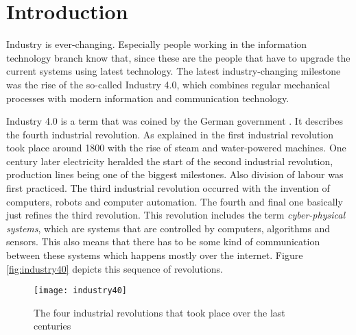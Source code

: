 \chapter{Introduction}
\label{ch:Introduction}




Industry is ever-changing. Especially people working in the information technology branch know that, since these are the people that have to upgrade the current systems using latest technology. The latest industry-changing milestone was the rise of the so-called Industry 4.0, which combines regular mechanical processes with modern information and communication technology.

Industry 4.0 is a term that was coined by the German government \autocite{Industrie4.0Paper}. It describes the fourth industrial revolution. As explained in  the first industrial revolution took place around 1800 with the rise of steam and water-powered machines. One century later electricity heralded the start of the second industrial revolution, production lines being one of the biggest milestones. Also division of labour was first practiced. The third industrial revolution occurred with the invention of computers, robots and computer automation. The fourth and final one basically just refines the third revolution. This revolution includes the term \textit{cyber-physical systems}, which are systems that are controlled by computers, algorithms and sensors. This also means that there has to be some kind of communication between these systems which happens mostly over the internet. Figure \vref{fig:industry40} depicts this sequence of revolutions.

\begin{figure}[H]
    \centering
    \texttt{[image: industry40]}
    \caption[The four industrial revolutions that took place over the last centuries]{The four industrial revolutions that took place over the last centuries\footnotemark}
    \label{fig:industry40}
\end{figure}

